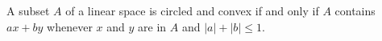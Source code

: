 A subset $A$ of a linear space is circled and convex if and only if $A$ contains $ax + by$ whenever $x$ and $y$ are in $A$ and $|a| + |b| \leq 1$.
